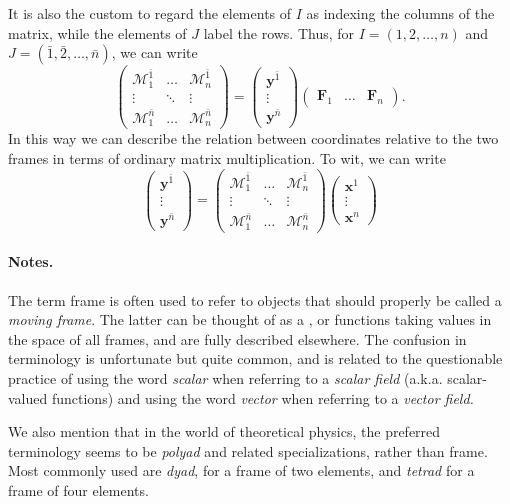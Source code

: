\documentclass[12pt]{article}
\newcommand{\bF}{\mathbf{F}}
\newcommand{\tmat}{\mathcal{M}}
\newcommand{\bx}{\mathbf{x}}
\newcommand{\by}{\mathbf{y}}
\begin{document}
It is also the custom to regard the elements of $I$ as indexing the
columns of the matrix, while the elements of $J$ label the rows.
Thus, for $I=(1,2,\ldots,n)$ and
$J=(\bar{1},\bar{2},\ldots,\bar{n})$, we can write
$$
\begin{pmatrix}
  \tmat^{\bar{1}}_1 & \ldots &\tmat^{\bar{1}}_n \\
  \vdots & \ddots & \vdots \\
  \tmat^{\bar{n}}_1 & \ldots &\tmat^{\bar{n}}_n
\end{pmatrix} = 
\begin{pmatrix}
  \by^{\bar{1}} \\ \vdots \\ \by^{\bar{n}}
\end{pmatrix}
\begin{pmatrix}
  \bF_1 & \ldots & \bF_n
\end{pmatrix}.
$$
In this way we can describe the relation between coordinates
relative to the two frames in terms of ordinary matrix multiplication.
To wit, we can write
$$
\begin{pmatrix}
  \by^{\bar{1}} \\ \vdots \\ \by^{\bar{n}}
\end{pmatrix}
=
\begin{pmatrix}
  \tmat^{\bar{1}}_1 & \ldots &\tmat^{\bar{1}}_n \\
  \vdots & \ddots & \vdots \\
  \tmat^{\bar{n}}_1 & \ldots &\tmat^{\bar{n}}_n
\end{pmatrix}
\begin{pmatrix}
  \bx^1 \\ \vdots \\ \bx^n
\end{pmatrix}
$$

\paragraph{Notes.}
The term frame is often used to refer to objects that
should properly be called a {\em moving frame}.  The latter can be
thought of as a , or functions taking
values in the space of all frames, and are fully described elsewhere.
The confusion in terminology is unfortunate but quite common, and is
related to the questionable practice of using the word {\em scalar}
when referring to a {\em scalar field} (a.k.a. scalar-valued
functions) and using the word {\em vector} when referring to a {\em
  vector field.}

We also mention that in the world of theoretical physics, the
preferred terminology seems to be {\em polyad} and related
specializations, rather than frame.  Most commonly used are {\em
  dyad}, for a frame of two elements, and {\em tetrad} for a frame of
four elements.
\end{document}
